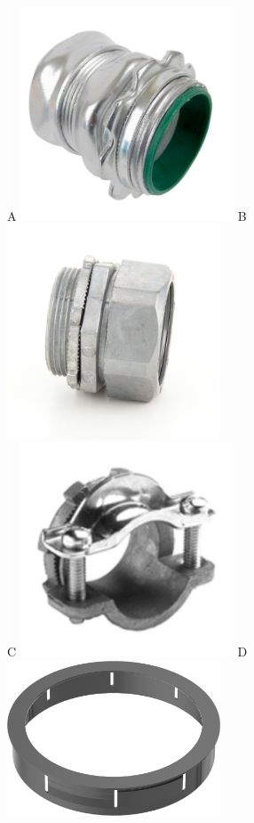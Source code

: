 \begin{figure}[p]
A \includegraphics[width=2.5in]{../FIGURES/Compression_Fitting_3p5} \hfill
B \includegraphics[width=2.5in]{../FIGURES/Zinc_Compression_Fitting} \\
C \includegraphics[width=2.5in]{../FIGURES/Strap_Connector}  \hfill
D \includegraphics[width=2.5in]{../FIGURES/Locking_Grommet} \\

\end{figure}
